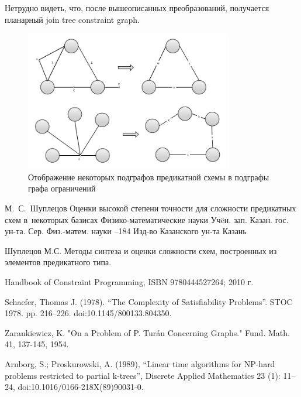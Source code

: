 \documentclass[12pt]{article}
\begin{document}
Нетрудно видеть, что, после вышеописанных преобразований, получается планарный join tree constraint graph.

\begin{figure}[htb]
\centering
\includegraphics[width=0.8\textwidth]{transform.png}
\caption{Отображение некоторых подграфов предикатной схемы в подграфы графа ограничений}
\label{fig:induced_to_constraint}
\end{figure}


\clearpage
    \by М.~С.~Шуплецов
    \paper Оценки высокой степени точности для сложности предикатных схем в~некоторых базисах
    \inbook Физико-математические науки
    \serial Уч\"eн. зап. Казан. гос. ун-та. Сер. Физ.-матем. науки
    --184
    \publ Изд-во Казанского ун-та
    \publaddr Казань

Шуплецов М.С. Методы синтеза и оценки сложности схем, построенных из элементов предикатного типа.

 Handbook of Constraint Programming, ISBN 9780444527264; 2010 г.

 Schaefer, Thomas J. (1978). 
``The Complexity of Satisfiability Problems''. STOC 1978. pp. 216–226. doi:10.1145/800133.804350.

 Zarankiewicz, K. "On a Problem of P. Turán Concerning Graphs." Fund. Math. 41, 137-145, 1954. 

 Arnborg, S.; Proskurowski, A. (1989), 
``Linear time algorithms for NP-hard problems restricted to partial k-trees'',
Discrete Applied Mathematics 23 (1): 11–24, doi:10.1016/0166-218X(89)90031-0.
\end{document}
